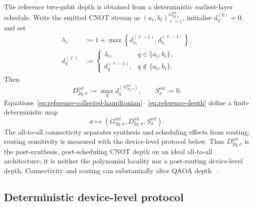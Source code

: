 \documentclass[a4paper,onecolumn,11pt,unpublished]{quantumarticle}
\theoremstyle{remark}
\begin{document}
The reference two-qubit depth is obtained from a deterministic earliest-layer
schedule.  Write the emitted CNOT stream as
\((a_\ell,b_\ell)_{\ell=1}^{G_{2q,\sigma}^{\mathrm{ref}}}\), initialise
\(d_q^{(0)}=0\), and set
\begin{align}
    \lambda_\ell
    &:=
    1+\max\left\{
        d_{a_\ell}^{(\ell-1)},d_{b_\ell}^{(\ell-1)}
    \right\},
    \label{eq:reference-asap-layer}\\
    d_q^{(\ell)}
    &:=
    \begin{cases}
        \lambda_\ell,&q\in\{a_\ell,b_\ell\},\\
        d_q^{(\ell-1)},&q\notin\{a_\ell,b_\ell\}.
    \end{cases}
    \label{eq:reference-asap-update}
\end{align}
Then
\begin{equation}
    D_{2q,\sigma}^{\mathrm{ref}}
    :=
    \max_qd_q^{(G_{2q,\sigma}^{\mathrm{ref}})},
    \qquad
    S_\sigma^{\mathrm{ref}}:=0.
    \label{eq:reference-depth}
\end{equation}
Equations~\eqref{eq:reference-collected-hamiltonian}--%
\eqref{eq:reference-depth} define a finite deterministic map
\[
    \sigma\longmapsto
    \left(
        G_{2q,\sigma}^{\mathrm{ref}},
        D_{2q,\sigma}^{\mathrm{ref}},
        S_\sigma^{\mathrm{ref}}
    \right).
\]
The all-to-all connectivity separates synthesis and scheduling effects from
routing; routing sensitivity is measured with the device-level protocol
below.  Thus $D_{2q,\sigma}^{\mathrm{ref}}$ is the post-synthesis,
post-scheduling CNOT depth on an ideal all-to-all architecture; it is neither
the polynomial locality nor a post-routing device-level depth.  Connectivity
and routing can substantially alter QAOA depth
~\cite{Weidenfeller2022,Pelofske2024,Rovara2026}.


\subsection{Deterministic device-level protocol}
\label{app:hardware-compiler-protocol}
\end{document}
